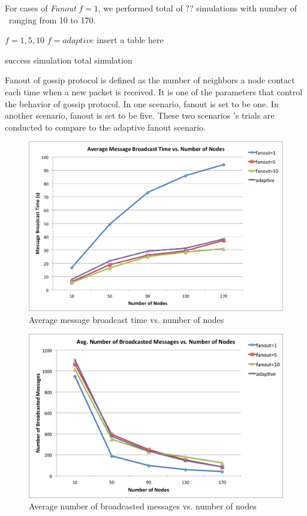 For cases of \emph{Fanout} $f=1$, we performed total of ?? simulations with number of \gns ~ranging from 10 to 170.

$f=1,5,10$  $f=adaptive$
insert a table here

success simulation
total simulation 

Fanout of gossip protocol is defined as the number of neighbors a node contact each time when a new packet is received. It is one of the parameters that control the behavior of gossip protocol. In one scenario, fanout is set to be one. In another scenario, fanout is set to be five. These two scenarios 's trials are conducted to compare to the adaptive fanout scenario. 

\begin{figure}
	\centering
	\includegraphics[width=5.5in]{brTime.png}
	\caption{Average message broadcast time vs. number of nodes}
	\label{fig:brTime}
\end{figure}

\begin{figure}
	\centering
	\includegraphics[width=5.5in]{brNum.png}
	\caption{Average number of broadcasted messages vs. number of nodes}
	\label{fig:brNum}
\end{figure}

